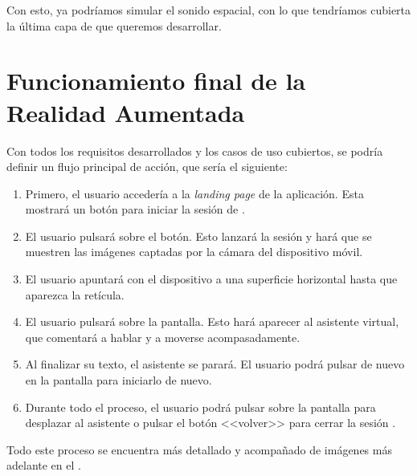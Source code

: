 \documentclass{subfiles}
\begin{document}
        Con esto, ya podríamos simular el sonido espacial, con lo que tendríamos cubierta la última capa de \ra que queremos desarrollar.

        \section{Funcionamiento final de la Realidad Aumentada}
        \label{sec:funcionamiento_final_de_la_realidad_aumentada}

        Con todos los requisitos desarrollados y los casos de uso cubiertos, se podría definir un flujo principal de acción, que sería el siguiente:

        \begin{enumerate}
            \item Primero, el usuario accedería a la \textit{landing page} de la aplicación. Esta mostrará un botón para iniciar la sesión de \ra.
            \item El usuario pulsará sobre el botón. Esto lanzará la sesión y hará que se muestren las imágenes captadas por la cámara del dispositivo móvil.
            \item El usuario apuntará con el dispositivo a una superficie horizontal hasta que aparezca la retícula.
            \item El usuario pulsará sobre la pantalla. Esto hará aparecer al asistente virtual, que comentará a hablar y a moverse acompasadamente.
            \item Al finalizar su texto, el asistente se parará. El usuario podrá pulsar de nuevo en la pantalla para iniciarlo de nuevo.
            \item Durante todo el proceso, el usuario podrá pulsar sobre la pantalla para desplazar al asistente o pulsar el botón <<volver>> para cerrar la sesión \ra.
        \end{enumerate}

        Todo este proceso se encuentra más detallado y acompañado de imágenes más adelante en el .
\end{document}
